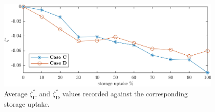 \begin{figure}\centering
	\includegraphics{_chapter4/fig/voltage-aimd-compare}
	\caption{Average $\zeta_\textbf{C}^{*}$ and $\zeta_\textbf{D}^{*}$ values recorded against the corresponding storage uptake.}
	\label{ch4:fig:voltage-aimd-compare}
\end{figure}
